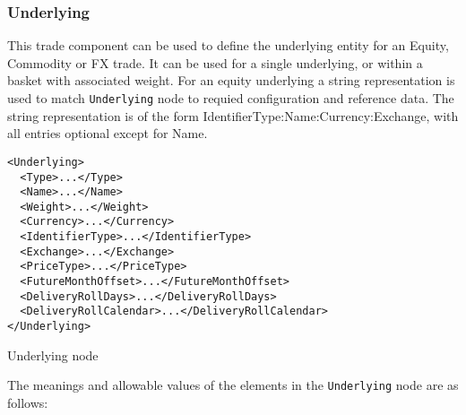 \subsubsection{Underlying}
\label{ss:underlying} 

This trade component can be used to define the underlying entity for an Equity, Commodity or FX trade. It can be used for a single underlying, or within a basket with associated weight. 
For an equity underlying a string representation is used to match \lstinline!Underlying! node to requied configuration and reference data. The string representation is of the form {IdentifierType}:{Name}:{Currency}:{Exchange}, with all entries optional except for Name.


\begin{listing}[H]
\begin{verbatim}
<Underlying>
  <Type>...</Type>
  <Name>...</Name>
  <Weight>...</Weight>
  <Currency>...</Currency>
  <IdentifierType>...</IdentifierType>
  <Exchange>...</Exchange>
  <PriceType>...</PriceType>
  <FutureMonthOffset>...</FutureMonthOffset>
  <DeliveryRollDays>...</DeliveryRollDays>
  <DeliveryRollCalendar>...</DeliveryRollCalendar>
</Underlying>
\end{verbatim}
\caption{Underlying node}
\label{lst:underlying}
\end{listing}

The meanings and allowable values of the elements in the \lstinline!Underlying! node are as follows:

